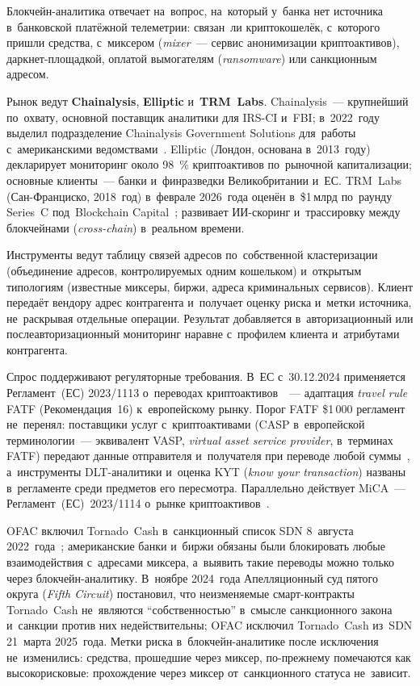Блокчейн-аналитика отвечает на~вопрос, на~который у~банка нет источника
в~банковской платёжной телеметрии: связан~ли криптокошелёк, с~которого
пришли средства, с~миксером (\textit{mixer}~--- сервис анонимизации
криптоактивов), даркнет-площадкой, оплатой вымогателям (\textit{ransomware})
или санкционным адресом.

Рынок ведут \textbf{Chainalysis}, \textbf{Elliptic} и~\textbf{TRM~Labs}.
Chainalysis~--- крупнейший по~охвату,
основной поставщик аналитики для IRS-CI и~FBI; в~2022~году выделил подразделение
Chainalysis Government Solutions для~работы с~американскими
ведомствами~\cite{chainalysis-overview}. Elliptic (Лондон, основана
в~2013~году) декларирует мониторинг около 98~\% криптоактивов по~рыночной капитализации;
основные клиенты~--- банки и~финразведки Великобритании и~ЕС. TRM~Labs
(Сан-Франциско, 2018~год) в~феврале 2026~года оценён в~\$1\,млрд по~раунду
Series~C под~Blockchain Capital~\cite{trm-series-c-2026}; развивает ИИ-скоринг и~трассировку
между блокчейнами (\textit{cross-chain}) в~реальном времени.

Инструменты ведут таблицу связей адресов по~собственной кластеризации
(объединение адресов, контролируемых одним кошельком) и~открытым типологиям
(известные миксеры, биржи, адреса криминальных сервисов). Клиент передаёт
вендору адрес контрагента и~получает оценку риска и~метки источника,
не~раскрывая отдельные операции. Результат добавляется
в~авторизационный или послеавторизационный мониторинг наравне с~профилем
клиента и~атрибутами контрагента.

Спрос поддерживают регуляторные требования. В~ЕС с~30.12.2024 применяется
Регламент~(ЕС) 2023/1113 о~переводах криптоактивов~\cite{eu-tfr-2023-1113}~--- адаптация
\textit{travel rule} FATF (Рекомендация~16) к~европейскому рынку. Порог FATF
\$1\,000 регламент не~перенял: поставщики услуг с~криптоактивами
(CASP в~европейской терминологии~--- эквивалент VASP, \textit{virtual asset
service provider}, в~терминах FATF) передают данные отправителя
и~получателя при переводе любой суммы~\cite{eba-travel-rule-2024}, а~инструменты
DLT-аналитики и~оценка KYT (\textit{know your transaction}) названы
в~регламенте среди предметов его пересмотра. Параллельно действует MiCA~---
Регламент~(ЕС)~2023/1114 о~рынке криптоактивов~\cite{mica-2023-1114}.

OFAC включил Tornado~Cash в~санкционный список SDN 8~августа 2022~года~\cite{ofac-tornado-cash};
американские банки и~биржи обязаны были блокировать любые взаимодействия
с~адресами миксера, а~выявить такие переводы можно только через
блокчейн-аналитику. В~ноябре 2024~года Апелляционный суд пятого округа
(\textit{Fifth Circuit}) постановил, что неизменяемые смарт-контракты Tornado~Cash
не~являются \enquote{собственностью} в~смысле санкционного закона и~санкции
против них недействительны; OFAC исключил Tornado~Cash из~SDN 21~марта
2025~года. Метки риска в~блокчейн-аналитике после исключения не~изменились:
средства, прошедшие через миксер, по-прежнему помечаются как
высокорисковые: прохождение через миксер от~санкционного статуса
не~зависит.
